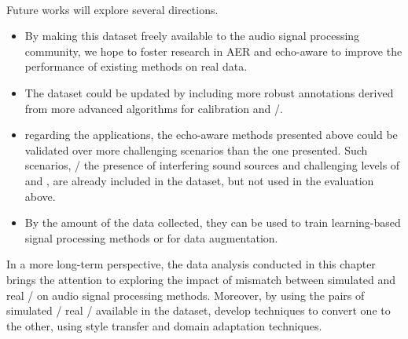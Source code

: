 \mynewline
\\Future works will explore several directions.
\begin{itemize}
    \item By making this dataset freely available to the audio signal processing community, we hope to foster research in AER and echo-aware to improve the performance of existing methods on real data.
    \item The dataset could be updated by including more robust annotations derived from more advanced algorithms for calibration and \AER/.
    \item regarding the applications, the echo-aware methods presented above could be validated over more challenging scenarios than the one presented.
    Such scenarios, \eg/ the presence of interfering sound sources and challenging levels of \SNR{} and \RT{}, are already included in the dataset, but not used in the evaluation above.
    \item By the amount of the data collected, they can be used to train learning-based signal processing methods or for data augmentation.
\end{itemize}
In a more long-term perspective, the data analysis conducted in this chapter brings the attention to exploring the impact of mismatch between simulated and real \RIR/ on audio signal processing methods.
Moreover, by using the pairs of simulated \vs/ real \RIRs/ available in the dataset, develop techniques to convert one to the other, using style transfer and domain adaptation techniques.
